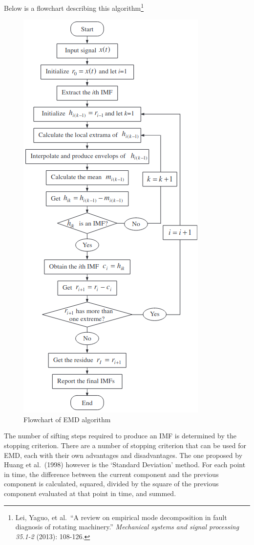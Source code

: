 \documentclass[
  english,
  paper=a4,
  oneside  ,captions=tableheading
]{scrbook}
\begin{document}
Below is a flowchart describing this algorithm\footnote{Lei, Yaguo, et
  al.~``A review on empirical mode decomposition in fault diagnosis of
  rotating machinery.'' \emph{Mechanical systems and signal processing
  35.1-2} (2013): 108-126.}

\begin{figure}
\centering
\includegraphics{img/emd_flowchart.png}
\caption{Flowchart of EMD algorithm}
\end{figure}


The number of sifting steps required to produce an IMF is determined by
the stopping criterion. There are a number of stopping criterion that
can be used for EMD, each with their own advantages and disadvantages.
The one proposed by Huang et al.~(1998) however is the `Standard
Deviation' method. For each point in time, the difference between the
current component and the previous component is calculated, squared,
divided by the square of the previous component evaluated at that point
in time, and summed.
\end{document}
